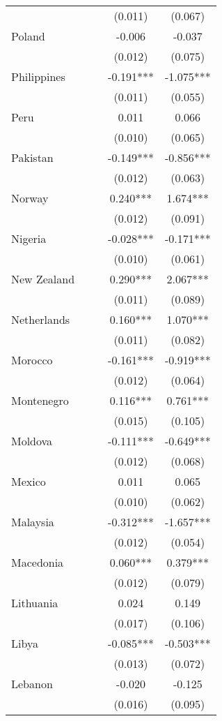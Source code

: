 \documentclass[]{article}
\begin{document}
\begin{tabular}{lcccc}
 &  &  & (0.011) & (0.067) \\
Poland &  &  & -0.006 & -0.037 \\
 &  &  & (0.012) & (0.075) \\
Philippines &  &  & -0.191*** & -1.075*** \\
 &  &  & (0.011) & (0.055) \\
Peru &  &  & 0.011 & 0.066 \\
 &  &  & (0.010) & (0.065) \\
Pakistan &  &  & -0.149*** & -0.856*** \\
 &  &  & (0.012) & (0.063) \\
Norway &  &  & 0.240*** & 1.674*** \\
 &  &  & (0.012) & (0.091) \\
Nigeria &  &  & -0.028*** & -0.171*** \\
 &  &  & (0.010) & (0.061) \\
New Zealand &  &  & 0.290*** & 2.067*** \\
 &  &  & (0.011) & (0.089) \\
Netherlands &  &  & 0.160*** & 1.070*** \\
 &  &  & (0.011) & (0.082) \\
Morocco &  &  & -0.161*** & -0.919*** \\
 &  &  & (0.012) & (0.064) \\
Montenegro &  &  & 0.116*** & 0.761*** \\
 &  &  & (0.015) & (0.105) \\
Moldova &  &  & -0.111*** & -0.649*** \\
 &  &  & (0.012) & (0.068) \\
Mexico &  &  & 0.011 & 0.065 \\
 &  &  & (0.010) & (0.062) \\
Malaysia &  &  & -0.312*** & -1.657*** \\
 &  &  & (0.012) & (0.054) \\
Macedonia &  &  & 0.060*** & 0.379*** \\
 &  &  & (0.012) & (0.079) \\
Lithuania &  &  & 0.024 & 0.149 \\
 &  &  & (0.017) & (0.106) \\
Libya &  &  & -0.085*** & -0.503*** \\
 &  &  & (0.013) & (0.072) \\
Lebanon &  &  & -0.020 & -0.125 \\
 &  &  & (0.016) & (0.095) \\

\end{tabular}
\end{document}
